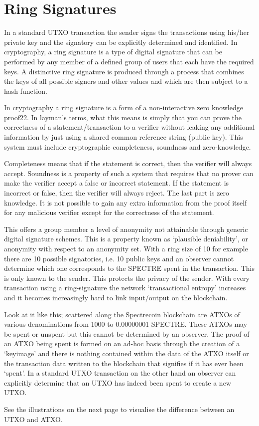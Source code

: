 \chapter{Ring Signatures}
In a standard UTXO transaction the sender signs the transactions using his/her
private key and the signatory can be explicitly determined and identified. In
cryptography, a ring signature is a type of digital signature that can be
performed by any member of a defined group of users that each have the required
keys. A distinctive ring signature is produced through a process that combines
the keys of all possible signers and other values and which are then subject to
a hash function.



In cryptography a ring signature is a form of a non-interactive zero knowledge
proof22. In layman’s terms, what this means is simply that you can prove the
correctness of a statement/transaction to a verifier without leaking any additional
information by just using a shared common reference string (public key).
This system must include cryptographic completeness, soundness and zero-knowledge.



Completeness means that if the statement is correct, then the verifier will
always accept. Soundness is a property of such a system that requires that
no prover can make the verifier accept a false or incorrect statement. If the
statement is incorrect or false, then the verifier will always reject. The
last part is zero knowledge. It is not possible to gain any extra information
from the proof itself for any malicious verifier except for the correctness of
the statement.



This offers a group member a level of anonymity not attainable through generic
digital signature schemes. This is a property known as ‘plausible deniability’,
or anonymity with respect to an anonymity set. With a ring size of 10 for example
there are 10 possible signatories, i.e. 10 public keys and an observer cannot
determine which one corresponds to the SPECTRE spent in the transaction. This
is only known to the sender. This protects the privacy of the sender. With every
transaction using a ring-signature the network ‘transactional entropy’ increases
and it becomes increasingly hard to link input/output on the blockchain.



Look at it like this; scattered along the Spectrecoin blockchain are ATXOs of
various denominations from 1000 to 0.00000001 SPECTRE. These ATXOs may be spent
or unspent but this cannot be determined by an observer. The proof of an ATXO
being spent is formed on an ad-hoc basis through the creation of a ‘keyimage’
and there is nothing contained within the data of the ATXO itself or the
transaction data written to the blockchain that signifies if it has ever been
‘spent’. In a standard UTXO transaction on the other hand an observer can
explicitly determine that an UTXO has indeed been spent to create a new UTXO.



See the illustrations on the next page to visualise the difference between an
UTXO and ATXO.